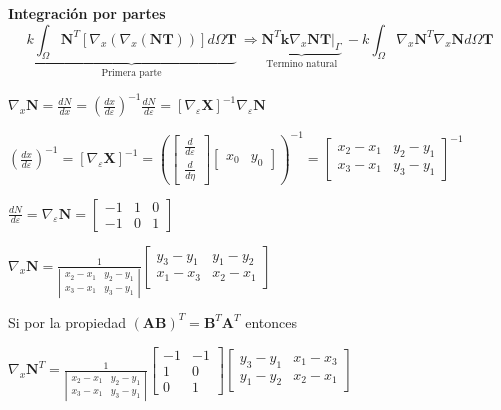 \documentclass[12pt]{report}
\begin{document}
    \begin{center}
        \textbf{Integración por partes}
        \[
        \displaystyle
        \underbrace{k\int_\Omega \bm N^T \left[\nabla_x (\nabla_x (\bm{NT}))\right]d\Omega \bm T}_{\text{Primera parte}}
        \ \Rightarrow
        \underbrace{\bm N^T \bm k \nabla_x \bm{NT}|_\Gamma}_{\text{Termino natural}}  
        \ - k \int_\Omega \nabla_x \bm N^T \nabla_x \bm N d\Omega \bm T
        \]

        $\displaystyle \nabla_x \bm N = \frac{dN}{dx} = \left( \frac{dx}{d\varepsilon}\right)^{-1} \frac{dN}{d\varepsilon} = \left[ \nabla_\varepsilon \bm X \right]^{-1} \nabla_\varepsilon \bm N$

        $\displaystyle \left( \frac{dx}{d\varepsilon} \right)^{-1} = \left[ \nabla_\varepsilon \bm X \right]^{-1} = \left( \left[ \begin{array}{c} \frac{d}{d\varepsilon} \\ \frac{d}{d\eta} \end{array} \right] \left[ \begin{array}{cc} x_0 & y_0 \end{array} \right] \right)^{-1} = \left[ \begin{array}{cc} x_2-x_1 & y_2-y_1 \\ x_3 - x_1 & y_3 - y_1 \end{array} \right]^{-1}$
        
        $\displaystyle \frac{dN}{d\varepsilon} = \nabla_\varepsilon \bm N = \left[ \begin{array}{ccc} -1 & 1 & 0 \\ -1 & 0 & 1 \end{array} \right]$

        $\displaystyle \nabla_x \bm N = \frac{1}{\left|\begin{array}{cc} x_2-x_1 & y_2-y_1 \\ x_3-x_1 & y_3-y_1 \end{array}\right|} \left[ \begin{array}{cc} y_3-y_1 & y_1 - y_2 \\ x_1 - x_3 & x_2 - x_1\end{array}\right]$
    \end{center}
        
    Si por la propiedad $\displaystyle (\bm{AB})^T = \bm B^T \bm A^T$ entonces

    \begin{center}
        $\displaystyle \nabla_x \bm N^T = \frac{1}{\left| \begin{array}{cc} x_2-x_1 & y_2-y_1 \\ x_3-x_1 & y_3 - y_1 \end{array}\right|} \left[ \begin{array}{cc} -1 & -1 \\ 1 & 0 \\ 0 & 1 \end{array} \right]  \left[ \begin{array}{cc} y_3-y_1 & x_1 - x_3\\ y_1 - y_2 & x_2 - x_1 \end{array} \right]$
    \end{center}
\end{document}
